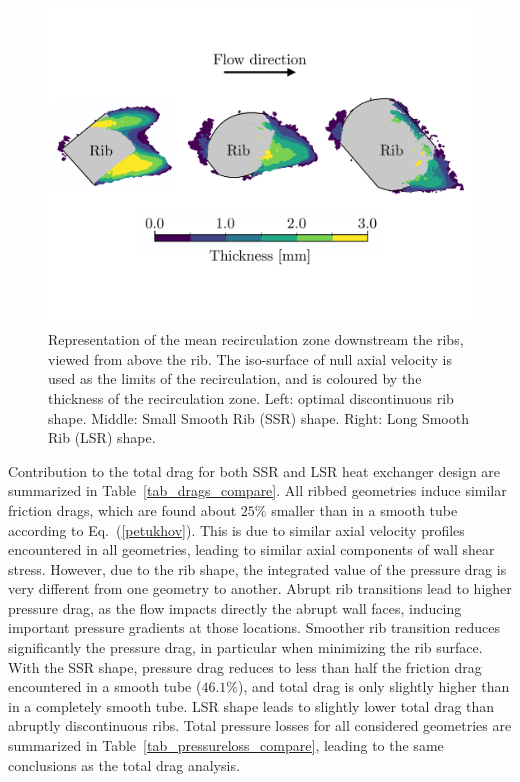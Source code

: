 \begin{figure}[h]
\centering
\includegraphics[width=18cm]{fig/applications/optim/Recircul_zones2.pdf}
\caption{Representation of the mean recirculation zone downstream the ribs, viewed from above the rib. The iso-surface of null axial velocity is used as the limits of the recirculation, and is coloured by the thickness of the recirculation zone. Left: optimal discontinuous rib shape. Middle: Small Smooth Rib (SSR) shape. Right: Long Smooth Rib (LSR) shape.}
\label{recircul_zones}
\end{figure}

Contribution to the total drag for both SSR and LSR heat exchanger design are summarized in Table~\ref{tab_drags_compare}. All ribbed geometries induce similar friction drags, which are found about $25 \%$ smaller than in a smooth tube according to Eq.~(\ref{petukhov}). This is due to similar axial velocity profiles encountered in all geometries, leading to similar axial components of wall shear stress. However, due to the rib shape, the integrated value of the pressure drag is very different from one geometry to another. Abrupt rib transitions lead to higher pressure drag, as the flow impacts directly the abrupt wall faces, inducing important pressure gradients at those locations. Smoother rib transition reduces significantly the pressure drag, in particular when minimizing the rib surface. With the SSR shape, pressure drag reduces to less than half the friction drag encountered in a smooth tube ($46.1 \%$), and total drag is only slightly higher than in a completely smooth tube. LSR shape leads to slightly lower total drag than abruptly discontinuous ribs. Total pressure losses for all considered geometries are summarized in Table~\ref{tab_pressureloss_compare}, leading to the same conclusions as the total drag analysis.\\

